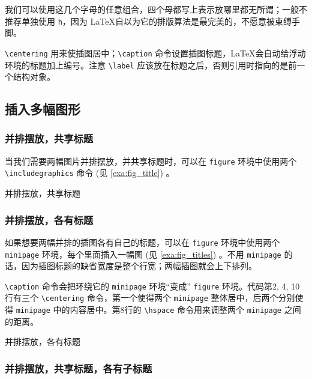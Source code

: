 我们可以使用这几个字母的任意组合，四个母都写上表示放哪里都无所谓；一般不推荐单独使用 \texttt{h}，因为 \LaTeX 自以为它的排版算法是最完美的，不愿意被束缚手脚。

\verb|\centering| 用来使插图居中；\verb|\caption| 命令设置插图标题，\LaTeX 会自动给浮动环境的标题加上编号。注意 \verb|\label| 应该放在标题之后，否则引用时指向的是前一个结构对象。

\subsection{插入多幅图形}
\subsubsection{并排摆放，共享标题}

当我们需要两幅图片并排摆放，并共享标题时，可以在 \texttt{figure} 环境中使用两个 \verb|\includegraphics| 命令 (见 \autoref{exa:fig_title}) 。

\begin{example}[h]
\caption{并排摆放，共享标题}
\label{exa:fig_title}
\end{example}

\subsubsection{并排摆放，各有标题}

如果想要两幅并排的插图各有自己的标题，可以在 \texttt{figure} 环境中使用两个 \texttt{minipage} 环境，每个里面插入一幅图 (见 \autoref{exa:fig_titles}) 。不用 \texttt{minipage} 的话，因为插图标题的缺省宽度是整个行宽；两幅插图就会上下排列。

\verb|\caption| 命令会把环绕它的 \texttt{minipage} 环境“变成” \texttt{figure} 环境。代码第2, 4, 10行有三个 \verb|\centering| 命令，第一个使得两个 \texttt{minipage} 整体居中，后两个分别使得 \texttt{minipage} 中的内容居中。第8行的 \verb|\hspace| 命令用来调整两个 \texttt{minipage} 之间的距离。


\begin{example}[h]
\caption{并排摆放，各有标题}
\label{exa:fig_titles}
\end{example}

\subsubsection{并排摆放，共享标题，各有子标题}

